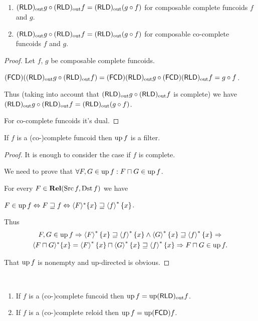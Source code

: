 \begin{thm}
~
\begin{enumerate}
\item $(\mathsf{RLD})_{\mathrm{out}} g\circ(\mathsf{RLD})_{\mathrm{out}} f=(\mathsf{RLD})_{\mathrm{out}}(g\circ f)$ for composable
complete funcoids $f$ and $g$.
\item $(\mathsf{RLD})_{\mathrm{out}} g\circ(\mathsf{RLD})_{\mathrm{out}} f=(\mathsf{RLD})_{\mathrm{out}}(g\circ f)$ for composable
co-complete funcoids $f$ and $g$.
\end{enumerate}
\end{thm}
\begin{proof}
Let $f$, $g$ be composable complete funcoids.

$(\mathsf{FCD})((\mathsf{RLD})_{\mathrm{out}} g\circ(\mathsf{RLD})_{\mathrm{out}} f)=(\mathsf{FCD})(\mathsf{RLD})_{\mathrm{out}} g\circ(\mathsf{FCD})(\mathsf{RLD})_{\mathrm{out}} f=g\circ f$.

Thus (taking into account that $(\mathsf{RLD})_{\mathrm{out}} g\circ(\mathsf{RLD})_{\mathrm{out}} f$ is complete)
we have $(\mathsf{RLD})_{\mathrm{out}} g\circ(\mathsf{RLD})_{\mathrm{out}} f=(\mathsf{RLD})_{\mathrm{out}}(g\circ f)$.

For co-complete funcoids it's dual.\end{proof}

\begin{prop}\label{up-f-filt}
  If $f$ is a (co-)complete funcoid then $\operatorname{up} f$ is a filter.
\end{prop}

\begin{proof}
  It is enough to consider the case if $f$ is complete.
  
  We need to prove that $\forall F, G \in \operatorname{up} f : F \sqcap G \in
  \operatorname{up} f$.
  
  For every $F \in \mathbf{Rel} (\operatorname{Src} f , \operatorname{Dst} f)$ we
  have
  
  $F \in \operatorname{up} f \Leftrightarrow F \sqsupseteq f \Leftrightarrow \langle F
  \rangle^{\ast} \{ x \} \sqsupseteq \left\langle f\right\rangle ^{\ast} \{ x \}$.
  
  Thus
\begin{multline*}
F, G \in \operatorname{up} f \Rightarrow \left\langle F\right\rangle ^{\ast} \{ x \}
  \sqsupseteq \left\langle f\right\rangle ^{\ast} \{ x \} \wedge \left\langle G\right\rangle ^{\ast}
  \{ x \} \sqsupseteq \left\langle f\right\rangle ^{\ast} \{ x \} \Rightarrow \\ \langle F
  \sqcap G \rangle^{\ast} \{ x \} = \left\langle F\right\rangle ^{\ast} \{ x \} \sqcap
  \left\langle G\right\rangle ^{\ast} \{ x \} \sqsupseteq \left\langle f\right\rangle ^{\ast} \{ x
  \} \Rightarrow F \sqcap G \in \operatorname{up} f.
\end{multline*}
  
  That $\operatorname{up} f$ is nonempty and up-directed is obvious.
\end{proof}

\begin{cor}
  ~  
  \begin{enumerate}
    \item If $f$ is a (co-)complete funcoid then $\operatorname{up} f = \operatorname{up}
    (\mathsf{RLD})_{\mathrm{out}} f$.
    
    \item If $f$ is a (co-)complete reloid then $\operatorname{up} f = \operatorname{up}
    (\mathsf{FCD}) f$.
  \end{enumerate}
\end{cor}

